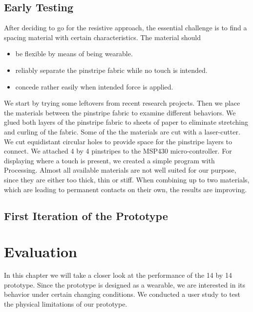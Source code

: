\section{Early Testing}
After deciding to go for the resistive approach, the essential challenge is to find a spacing material with certain characteristics. The material should
\begin{itemize}
\item be flexible by means of being wearable.
\item reliably separate the pinstripe fabric while no touch is intended.
\item concede rather easily when intended force is applied.
\end{itemize}
We start by trying some leftovers from recent research projects. 
Then we place the materials between the pinstripe fabric to examine different behaviors. We glued both layers of the pinstripe fabric to sheets of paper to eliminate stretching and curling of the fabric. Some of the the materials are cut with a laser-cutter. We cut equidistant circular holes to provide space for the pinstripe layers to connect. We attached 4 by 4 pinstripes to the MSP430 micro-controller. For displaying where a touch is present, we created a simple program with Processing.
Almost all available materials are not well suited for our purpose, since they are either too thick, thin or stiff. When combining up to two materials, which are leading to permanent contacts on their own, the results are improving. 
\section{First Iteration of the Prototype}



\chapter{Evaluation}
In this chapter we will take a closer look at the performance of the 14 by 14 prototype. Since the prototype is designed as a wearable, we are interested in its behavior under certain changing conditions. We conducted a user study to test the physical limitations of our prototype. 

